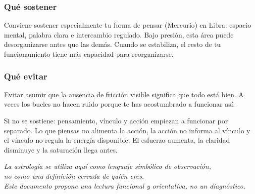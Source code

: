 \documentclass[11pt,a4paper]{article}
\begin{document}
\subsubsection*{Qué sostener}

\justifying
Conviene sostener especialmente tu forma de pensar (Mercurio) en Libra: espacio mental, palabra clara e intercambio regulado. Bajo presión, esta área puede desorganizarse antes que las demás. Cuando se estabiliza, el resto de tu funcionamiento tiene más capacidad para reorganizarse.

\subsubsection*{Qué evitar}

\justifying
Evitar asumir que la ausencia de fricción visible significa que todo está bien. A veces los bucles no hacen ruido porque te has acostumbrado a funcionar así.

\vspace{0.6cm}

\justifying
Si no se sostiene: pensamiento, vínculo y acción empiezan a funcionar por separado. Lo que piensas no alimenta la acción, la acción no informa al vínculo y el vínculo no regula la energía disponible. El esfuerzo aumenta, la claridad disminuye y la saturación llega antes.

\vspace{1.2cm}

\begin{center}
{\small\itshape\color{grisai}
La astrología se utiliza aquí como lenguaje simbólico de observación,\\
no como una definición cerrada de quién eres.\\[0.2cm]
Este documento propone una lectura funcional y orientativa, no un diagnóstico.
}
\end{center}
\end{document}
